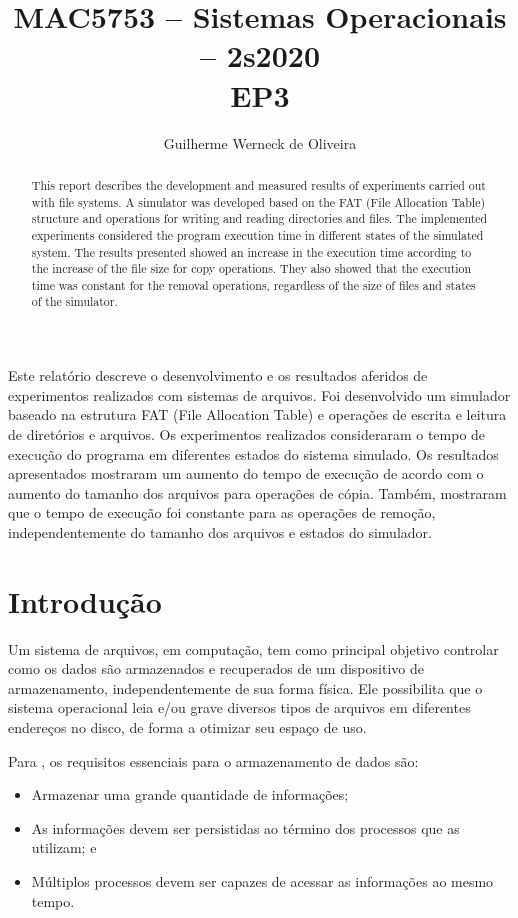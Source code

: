 \documentclass[12pt]{article}
\title{MAC5753 -- Sistemas Operacionais -- 2s2020\\ EP3}
\author{Guilherme Werneck de Oliveira\inst{1}}
\begin{document}
\maketitle

\begin{abstract}
	This report describes the development and measured results of experiments carried out with file systems. A simulator was developed based on the FAT (File Allocation Table) structure and operations for writing and reading directories and files. The implemented experiments considered the program execution time in different states of the simulated system. The results presented showed an increase in the execution time according to the increase of the file size for copy operations. They also showed that the execution time was constant for the removal operations, regardless of the size of files and states of the simulator.
\end{abstract}

\begin{resumo}
  Este relatório descreve o desenvolvimento e os resultados aferidos de experimentos realizados com sistemas de arquivos. Foi desenvolvido um simulador baseado na estrutura FAT (File Allocation Table) e operações de escrita e leitura de diretórios e arquivos. Os experimentos realizados consideraram o tempo de execução do programa em diferentes estados do sistema simulado. Os resultados apresentados mostraram um aumento do tempo de execução de acordo com o aumento do tamanho dos arquivos para operações de cópia. Também, mostraram que o tempo de execução foi constante para as operações de remoção, independentemente do tamanho dos arquivos e estados do simulador.
\end{resumo}


\section{Introdução}

Um sistema de arquivos, em computação, tem como principal objetivo controlar como os dados são armazenados e recuperados de um dispositivo de armazenamento, independentemente de sua forma física. Ele possibilita que o sistema operacional leia e/ou grave diversos tipos de arquivos em diferentes endereços no disco, de forma a otimizar seu espaço de uso.

Para \cite{tanenbaum:16}, os requisitos essenciais para o armazenamento de dados são:

\begin{itemize}
	\item Armazenar uma grande quantidade de informações;
	\item As informações devem ser persistidas ao término dos processos que as utilizam; e
	\item Múltiplos processos devem ser capazes de acessar as informações ao mesmo tempo.
\end{itemize}
\end{document}
